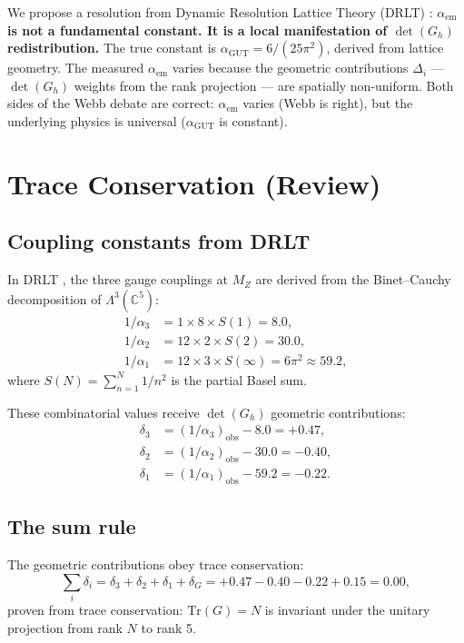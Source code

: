 \documentclass[12pt]{article}
\theoremstyle{remark}
\begin{document}
We propose a resolution from Dynamic Resolution Lattice Theory (DRLT) \cite{DRLT}: \textbf{$\alpha_\text{em}$ is not a fundamental constant. It is a local manifestation of $\det(G_h)$ redistribution.} The true constant is $\alpha_\text{GUT} = 6/(25\pi^2)$, derived from lattice geometry. The measured $\alpha_\text{em}$ varies because the geometric contributions $\Delta_i$ --- $\det(G_h)$ weights from the rank projection --- are spatially non-uniform. Both sides of the Webb debate are correct: $\alpha_\text{em}$ varies (Webb is right), but the underlying physics is universal ($\alpha_\text{GUT}$ is constant).

\section{Trace Conservation (Review)}

\subsection{Coupling constants from DRLT}

In DRLT \cite{DRLT}, the three gauge couplings at $M_Z$ are derived from the Binet--Cauchy decomposition of $\Lambda^3(\mathbb{C}^5)$:
\begin{align}
1/\alpha_3 &= 1 \times 8 \times S(1) = 8.0, \\
1/\alpha_2 &= 12 \times 2 \times S(2) = 30.0, \\
1/\alpha_1 &= 12 \times 3 \times S(\infty) = 6\pi^2 \approx 59.2,
\end{align}
where $S(N) = \sum_{n=1}^{N} 1/n^2$ is the partial Basel sum.

These combinatorial values receive $\det(G_h)$ geometric contributions:
\begin{align}
\delta_3 &= (1/\alpha_3)_\text{obs} - 8.0 = +0.47, \\
\delta_2 &= (1/\alpha_2)_\text{obs} - 30.0 = -0.40, \\
\delta_1 &= (1/\alpha_1)_\text{obs} - 59.2 = -0.22.
\end{align}

\subsection{The sum rule}

The geometric contributions obey trace conservation:
\begin{equation}
\sum_i \delta_i = \delta_3 + \delta_2 + \delta_1 + \delta_G = +0.47 - 0.40 - 0.22 + 0.15 = 0.00,
\end{equation}
proven from trace conservation: $\text{Tr}(G) = N$ is invariant under the unitary projection from rank $N$ to rank 5.
\end{document}
